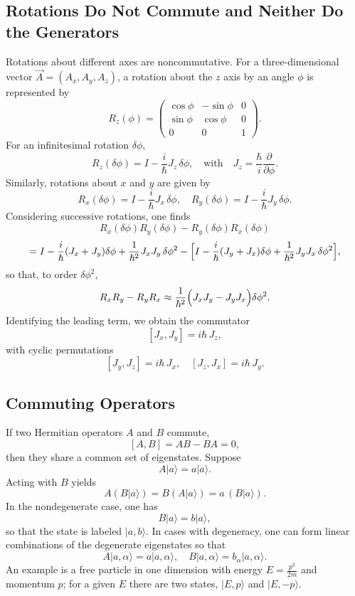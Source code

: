 \documentclass[twocolumn]{article}
\begin{document}
\begin{spacing}{1}
  \subsection{Rotations Do Not Commute and Neither Do the Generators}
  Rotations about different axes are noncommutative. For a three-dimensional vector \(\vec{A}=(A_x,A_y,A_z)\), a rotation about the \(z\) axis by an angle \(\phi\) is represented by
  \[
  R_z(\phi)=\begin{pmatrix}\cos\phi & -\sin\phi & 0\\[1mm]\sin\phi & \cos\phi & 0\\[1mm]0&0&1\end{pmatrix}.
  \]
  For an infinitesimal rotation \(\delta\phi\),
  \[
  R_z(\delta\phi)=I-\frac{i}{\hbar}J_z\,\delta\phi,\quad\text{with}\quad J_z=\frac{\hbar}{i}\frac{\partial}{\partial\phi}.
  \]
  Similarly, rotations about \(x\) and \(y\) are given by
  \[
  R_x(\delta\phi)=I-\frac{i}{\hbar}J_x\,\delta\phi,\quad R_y(\delta\phi)=I-\frac{i}{\hbar}J_y\,\delta\phi.
  \]
  Considering successive rotations, one finds
  \[
  R_x(\delta\phi)R_y(\delta\phi)-R_y(\delta\phi)R_x(\delta\phi)
  \]
  \[
  =I-\frac{i}{\hbar}(J_x+J_y)\delta\phi+\frac{1}{\hbar^2}J_xJ_y\,\delta\phi^2-\Bigl[I-\frac{i}{\hbar}(J_y+J_x)\delta\phi+\frac{1}{\hbar^2}J_yJ_x\,\delta\phi^2\Bigr],
  \]
  so that, to order \(\delta\phi^2\),
  \[
  R_xR_y-R_yR_x\approx\frac{1}{\hbar^2}\Bigl(J_xJ_y-J_yJ_x\Bigr)\delta\phi^2.
  \]
  Identifying the leading term, we obtain the commutator
  \[
  [J_x,J_y]=i\hbar\,J_z,
  \]
  with cyclic permutations
  \[
  [J_y,J_z]=i\hbar\,J_x,\quad [J_z,J_x]=i\hbar\,J_y.
  \]
  
  \subsection{Commuting Operators}
  If two Hermitian operators \(A\) and \(B\) commute,
  \[
  [A,B]=AB-BA=0,
  \]
  then they share a common set of eigenstates. Suppose
  \[
  A|a\rangle=a|a\rangle.
  \]
  Acting with \(B\) yields
  \[
  A(B|a\rangle)=B(A|a\rangle)=a\,(B|a\rangle).
  \]
  In the nondegenerate case, one has
  \[
  B|a\rangle=b|a\rangle,
  \]
  so that the state is labeled \(|a,b\rangle\). In cases with degeneracy, one can form linear combinations of the degenerate eigenstates so that
  \[
  A|a,\alpha\rangle=a|a,\alpha\rangle,\quad B|a,\alpha\rangle=b_\alpha|a,\alpha\rangle.
  \]
  An example is a free particle in one dimension with energy \(E=\frac{p^2}{2m}\) and momentum \(p\); for a given \(E\) there are two states, \(|E,p\rangle\) and \(|E,-p\rangle\).
  

\end{spacing}
\end{document}
